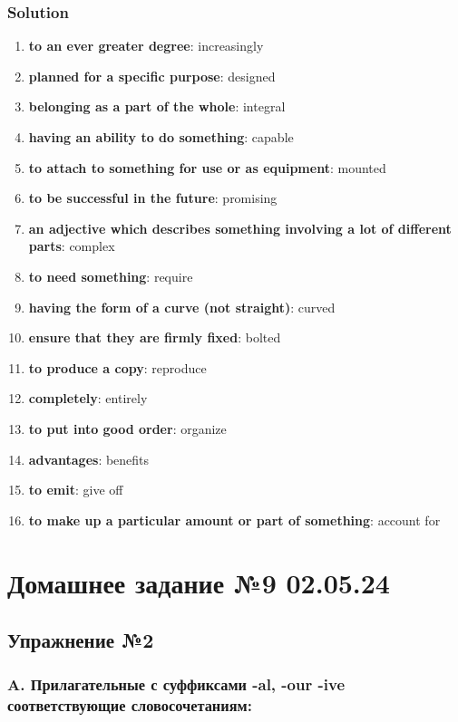 \subsection*{Solution}
\begin{enumerate}
      \item \textbf{to an ever greater degree}: increasingly
      \item \textbf{planned for a specific purpose}: designed
      \item \textbf{belonging as a part of the whole}: integral
      \item \textbf{having an ability to do something}: capable
      \item \textbf{to attach to something for use or as equipment}: mounted
      \item \textbf{to be successful in the future}: promising
      \item \textbf{an adjective which describes something involving a lot of different parts}: complex
      \item \textbf{to need something}: require
      \item \textbf{having the form of a curve (not straight)}: curved
      \item \textbf{ensure that they are firmly fixed}: bolted
      \item \textbf{to produce a copy}: reproduce
      \item \textbf{completely}: entirely
      \item \textbf{to put into good order}: organize
      \item \textbf{advantages}: benefits
      \item \textbf{to emit}: give off
      \item \textbf{to make up a particular amount or part of something}: account for
\end{enumerate}

\chapter{Домашнее задание №9 02.05.24}

\section{Упражнение №2}
\subsection*{A. Прилагательные с суффиксами -al, -our -ive соответствующие словосочетаниям:}

